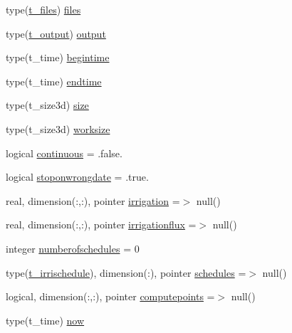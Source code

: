 \begin{DoxyCompactItemize}
type(\mbox{\hyperlink{structmoduleirrigation_1_1t__files}{t\+\_\+files}}) \mbox{\hyperlink{structmoduleirrigation_1_1t__irrigation_a6046bf61a352b933050204d2a49d0493}{files}}
\item 
type(\mbox{\hyperlink{structmoduleirrigation_1_1t__output}{t\+\_\+output}}) \mbox{\hyperlink{structmoduleirrigation_1_1t__irrigation_a4bafcca07ed47e732d834dcb31fab2aa}{output}}
\item 
type(t\+\_\+time) \mbox{\hyperlink{structmoduleirrigation_1_1t__irrigation_ababdd4c921ebe2d6cba533c056d0f200}{begintime}}
\item 
type(t\+\_\+time) \mbox{\hyperlink{structmoduleirrigation_1_1t__irrigation_af476fc61f9c13df428fff85b368bc2c8}{endtime}}
\item 
type(t\+\_\+size3d) \mbox{\hyperlink{structmoduleirrigation_1_1t__irrigation_afbe11f5670f337f061ef537f93d7f39d}{size}}
\item 
type(t\+\_\+size3d) \mbox{\hyperlink{structmoduleirrigation_1_1t__irrigation_a07f50cac351b4d8bfa1ef875edee0d9b}{worksize}}
\item 
logical \mbox{\hyperlink{structmoduleirrigation_1_1t__irrigation_a26e7f7895a41a56dcac7f1c2ccd4d847}{continuous}} = .false.
\item 
logical \mbox{\hyperlink{structmoduleirrigation_1_1t__irrigation_a535ae2d2458734c48d7141d944cc267c}{stoponwrongdate}} = .true.
\item 
real, dimension(\+:,\+:), pointer \mbox{\hyperlink{structmoduleirrigation_1_1t__irrigation_a7eced329f38e8c317ee4326e31ca30ea}{irrigation}} =$>$ null()
\item 
real, dimension(\+:,\+:), pointer \mbox{\hyperlink{structmoduleirrigation_1_1t__irrigation_a603b806b92d9db7bf6fd48a1cafddeaa}{irrigationflux}} =$>$ null()
\item 
integer \mbox{\hyperlink{structmoduleirrigation_1_1t__irrigation_aa6ebfeafba6e8345d074a9249cc8b8fc}{numberofschedules}} = 0
\item 
type(\mbox{\hyperlink{structmoduleirrigation_1_1t__irrischedule}{t\+\_\+irrischedule}}), dimension(\+:), pointer \mbox{\hyperlink{structmoduleirrigation_1_1t__irrigation_ac7065950d52c1a118021804b4a7b096f}{schedules}} =$>$ null()
\item 
logical, dimension(\+:,\+:), pointer \mbox{\hyperlink{structmoduleirrigation_1_1t__irrigation_ae124b120bbade8d2c901156c8599b94f}{computepoints}} =$>$ null()
\item 
type(t\+\_\+time) \mbox{\hyperlink{structmoduleirrigation_1_1t__irrigation_aab5d32e19ce23f66dbc57d7b89d43e1e}{now}}

\end{DoxyCompactItemize}
